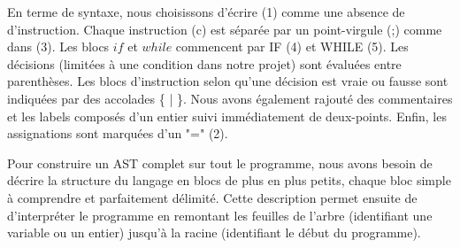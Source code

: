 \documentclass[a4paper]{article}
\begin{document}
En terme de syntaxe, nous choisissons d'écrire (1) comme une absence de d'instruction. Chaque instruction (c) est séparée par un point-virgule (;) comme dans (3). Les blocs $if$ et $while$ commencent par IF (4) et WHILE (5). Les décisions (limitées à une condition dans notre projet) sont évaluées entre parenthèses. Les blocs d'instruction selon qu'une décision est vraie ou fausse sont indiquées par des accolades \{ | \}. Nous avons également rajouté des commentaires et les labels composés d'un entier suivi immédiatement de deux-points. Enfin, les assignations sont marquées d'un "=" (2). 

Pour construire un AST complet sur tout le programme, nous avons besoin de décrire la structure du langage en blocs de plus en plus petits, chaque bloc simple à comprendre et parfaitement délimité. Cette description permet ensuite de d'interpréter le programme en remontant les feuilles de l'arbre (identifiant une variable ou un entier) jusqu'à la racine (identifiant le début du programme). 
\end{document}
